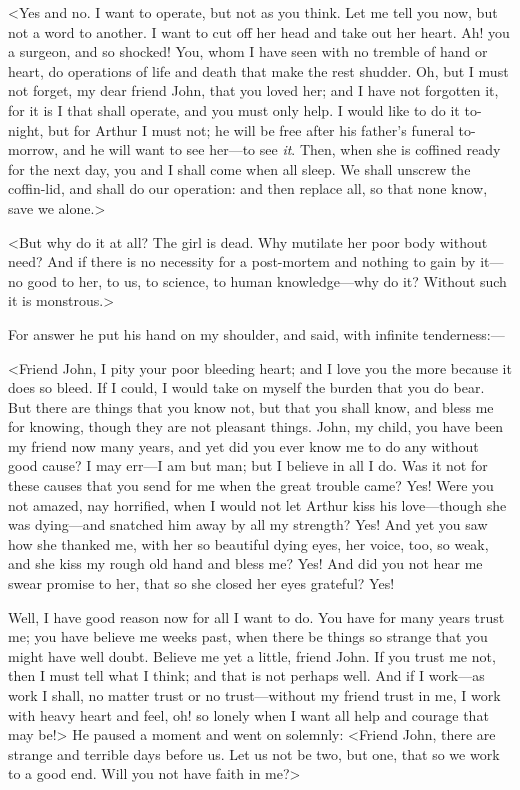 <Yes and no. I want to operate, but not as you think. Let me tell you now, but not a word to another. I want to cut off her head and take out her heart. Ah! you a surgeon, and so shocked! You, whom I have seen with no tremble of hand or heart, do operations of life and death that make the rest shudder. Oh, but I must not forget, my dear friend John, that you loved her; and I have not forgotten it, for it is I that shall operate, and you must only help. I would like to do it to-night, but for Arthur I must not; he will be free after his father's funeral to-morrow, and he will want to see her—to see \textit{it}. Then, when she is coffined ready for the next day, you and I shall come when all sleep. We shall unscrew the coffin-lid, and shall do our operation: and then replace all, so that none know, save we alone.>

<But why do it at all? The girl is dead. Why mutilate her poor body without need? And if there is no necessity for a post-mortem and nothing to gain by it—no good to her, to us, to science, to human knowledge—why do it? Without such it is monstrous.>

For answer he put his hand on my shoulder, and said, with infinite tenderness:—

<Friend John, I pity your poor bleeding heart; and I love you the more because it does so bleed. If I could, I would take on myself the burden that you do bear. But there are things that you know not, but that you shall know, and bless me for knowing, though they are not pleasant things. John, my child, you have been my friend now many years, and yet did you ever know me to do any without good cause? I may err—I am but man; but I believe in all I do. Was it not for these causes that you send for me when the great trouble came? Yes! Were you not amazed, nay horrified, when I would not let Arthur kiss his love—though she was dying—and snatched him away by all my strength? Yes! And yet you saw how she thanked me, with her so beautiful dying eyes, her voice, too, so weak, and she kiss my rough old hand and bless me? Yes! And did you not hear me swear promise to her, that so she closed her eyes grateful? Yes!

Well, I have good reason now for all I want to do. You have for many years trust me; you have believe me weeks past, when there be things so strange that you might have well doubt. Believe me yet a little, friend John. If you trust me not, then I must tell what I think; and that is not perhaps well. And if I work—as work I shall, no matter trust or no trust—without my friend trust in me, I work with heavy heart and feel, oh! so lonely when I want all help and courage that may be!> He paused a moment and went on solemnly: <Friend John, there are strange and terrible days before us. Let us not be two, but one, that so we work to a good end. Will you not have faith in me?>


